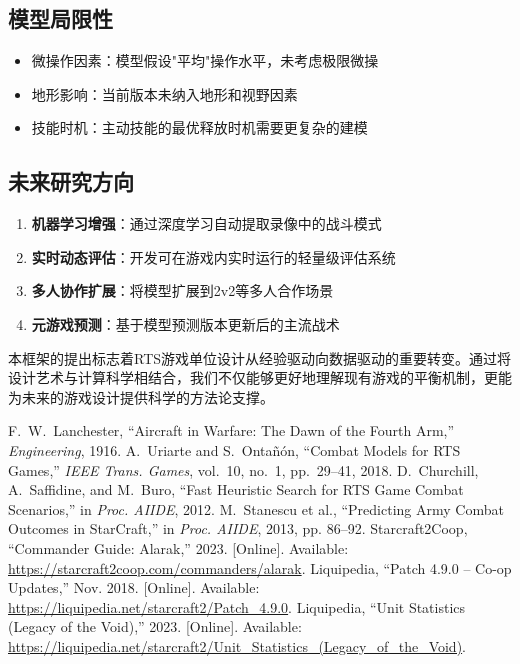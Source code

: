 \documentclass[a4paper,12pt]{article}
\begin{document}
\subsection{模型局限性}
\begin{itemize}
\item 微操作因素：模型假设"平均"操作水平，未考虑极限微操
\item 地形影响：当前版本未纳入地形和视野因素
\item 技能时机：主动技能的最优释放时机需要更复杂的建模
\end{itemize}

\subsection{未来研究方向}
\begin{enumerate}
\item \textbf{机器学习增强}：通过深度学习自动提取录像中的战斗模式
\item \textbf{实时动态评估}：开发可在游戏内实时运行的轻量级评估系统
\item \textbf{多人协作扩展}：将模型扩展到2v2等多人合作场景
\item \textbf{元游戏预测}：基于模型预测版本更新后的主流战术
\end{enumerate}

本框架的提出标志着RTS游戏单位设计从经验驱动向数据驱动的重要转变。通过将设计艺术与计算科学相结合，我们不仅能够更好地理解现有游戏的平衡机制，更能为未来的游戏设计提供科学的方法论支撑。

\begin{thebibliography}{99}\small
{} F.~W.~Lanchester, ``Aircraft in Warfare: The Dawn of the Fourth Arm,'' \emph{Engineering}, 1916.
 A.~Uriarte and S.~Ontañón, ``Combat Models for RTS Games,'' \emph{IEEE Trans. Games}, vol.~10, no.~1, pp.~29–41, 2018.
 D.~Churchill, A.~Saffidine, and M.~Buro, ``Fast Heuristic Search for RTS Game Combat Scenarios,'' in \emph{Proc. AIIDE}, 2012.
 M.~Stanescu et al., ``Predicting Army Combat Outcomes in StarCraft,'' in \emph{Proc. AIIDE}, 2013, pp. 86–92.
 Starcraft2Coop, ``Commander Guide: Alarak,'' 2023. [Online]. Available: \url{https://starcraft2coop.com/commanders/alarak}.
 Liquipedia, ``Patch 4.9.0 – Co-op Updates,'' Nov. 2018. [Online]. Available: \url{https://liquipedia.net/starcraft2/Patch_4.9.0}.
 Liquipedia, ``Unit Statistics (Legacy of the Void),'' 2023. [Online]. Available: \url{https://liquipedia.net/starcraft2/Unit_Statistics_(Legacy_of_the_Void)}.
\end{thebibliography}
\end{document}
